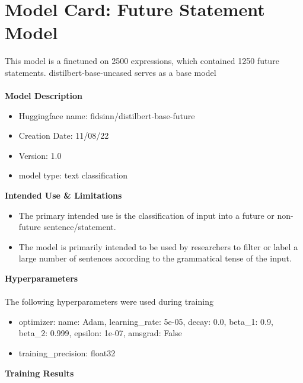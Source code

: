 \documentclass[11pt]{article}
\begin{document}
\section{Model Card: Future Statement Model}
This model is a finetuned on 2500 expressions, which contained 1250 future statements. distilbert-base-uncased serves as a base model 
\\
\\
%
\textbf{Model Description}
%
\begin{itemize}
    \item Huggingface name: fidsinn/distilbert-base-future
    \item Creation Date: 11/08/22
    \item Version: 1.0
    \item model type: text classification
\end{itemize}%
%
\textbf{Intended Use \& Limitations}
%
\begin{itemize}
    \item The primary intended use is the classification of input into a future or non-future sentence/statement.
    \item The model is primarily intended to be used by researchers to filter or label a large number of sentences according to the grammatical tense of the input.
\end{itemize}%
%
\textbf{Hyperparameters}
\\
\\
The following hyperparameters were used during training
\begin{itemize}
    \item optimizer: 
    name: Adam, learning\_rate: 5e-05, decay: 0.0, beta\_1: 0.9, beta\_2: 0.999, epsilon: 1e-07, amsgrad: False
    \item training\_precision: float32
\end{itemize}%
\label{sec:appendix}
%
\textbf{Training Results}
\\
\end{document}
